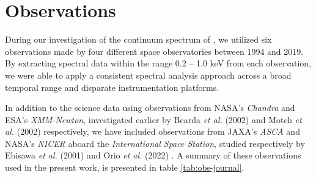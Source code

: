 \section{Observations}
	During our investigation of the continuum spectrum of \source, we utilized six observations made by four different space observatories between 1994 and 2019.
	By extracting spectral data within the range 0.2 -- 1.0 keV from each observation, we were able to apply a consistent spectral analysis approach across a broad temporal range and disparate instrumentation platforms.
		
	In addition to the science data using observations from NASA's \textit{Chandra} and ESA's \textit{XMM-Newton}, investigated earlier by Bearda \textit{et al.} (2002) \cite{beardaChandra2002AA} and Motch \textit{et al.} (2002) \cite{motchXmmNewton2002AA} respectively, we have included observations from JAXA's \textit{ASCA} and NASA's \textit{NICER} aboard the \textit{International Space Station}, studied respectively by Ebisawa \textit{et al.} (2001) \cite{ebisawaAsca2001ApJ} and Orio \textit{et al.} (2022) \cite{orioNicer2022ApJ}. A summary of these observations used in the present work, %
	is presented in table \ref{tab:obs-journal}. %
